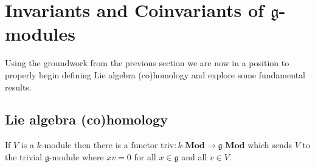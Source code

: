 \section{Invariants and Coinvariants of $ \mathfrak{g} $-modules} %
\label{sec:invariants}
Using the groundwork from the previous section we are now in a position to properly begin defining Lie algebra (co)homology and explore some fundamental results.

\subsection{Lie algebra (co)homology} %
\label{sub:Lie algebra (co)homology}
If $ V $ is a $ k $-module then there is a functor $ \text{triv}:k\text{-}\mathbf{Mod} \to \mathfrak{g}\text{-}\mathbf{Mod} $ which sends $ V $ to the trivial $ \mathfrak{g} $-module where $ xv = 0 $ for all $ x \in \mathfrak{g} $ and all $ v \in V $.

